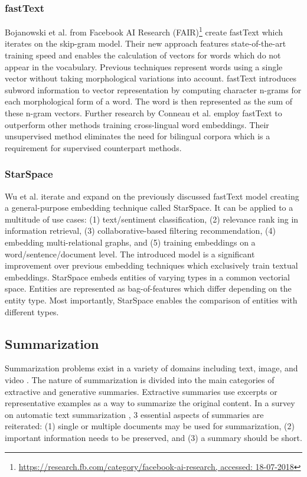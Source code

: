 \subsubsection{fastText}
Bojanowski et al. \cite{Bojanowski2016} from Facebook AI Research (FAIR)\footnote{\url{https://research.fb.com/category/facebook-ai-research, accessed: 18-07-2018}} create fastText which iterates on the skip-gram model.
Their new approach features state-of-the-art training speed and enables the calculation of vectors for words which do not appear in the vocabulary.
Previous techniques represent words using a single vector without taking morphological variations into account.
fastText introduces subword information to vector representation by computing character n-grams for each morphological form of a word.
The word is then represented as the sum of these n-gram vectors.
Further research by Conneau et al. \cite{Conneau2017} employ fastText to outperform other methods training cross-lingual word embeddings.
Their unsupervised method eliminates the need for bilingual corpora which is a requirement for supervised counterpart methods.


\subsubsection{StarSpace}
Wu et al. \cite{Wu2017} iterate and expand on the previously discussed fastText model creating a general-purpose embedding technique called StarSpace.
It can be applied to a multitude of use cases: (1) text/sentiment classification, (2) relevance rank ing in information retrieval, (3) collaborative-based filtering recommendation, (4) embedding multi-relational graphs, and (5) training embeddings on a word/sentence/document level.
The introduced model is a significant improvement over previous embedding techniques which exclusively train textual embeddings.
StarSpace embeds entities of varying types in a common vectorial space.
Entities are represented as bag-of-features which differ depending on the entity type.
Most importantly, StarSpace enables the comparison of entities with different types.


\subsection{Summarization} \label{sec:summarization}
Summarization problems exist in a variety of domains including text, image, and video \cite{B2018a}.
The nature of summarization is divided into the main categories of extractive \cite{Aggarwal2012} and generative summaries.
Extractive summaries use excerpts or representative examples as a way to summarize the original content.
In a survey on automatic text summarization \cite{Das2007}, 3 essential aspects of summaries are reiterated: (1) single or multiple documents may be used for summarization, (2) important information needs to be preserved, and (3) a summary should be short.

